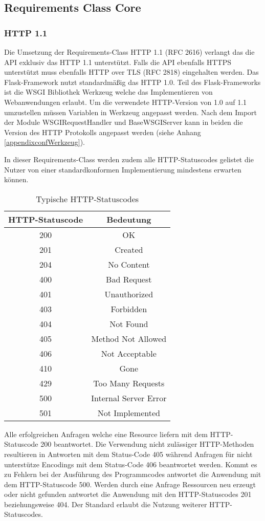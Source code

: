 \subsection{Requirements Class Core}
\subsubsection{HTTP 1.1}
Die Umsetzung der Requirements-Class HTTP 1.1 (RFC 2616) verlangt das die API exklusiv das HTTP 1.1 unterstützt. 
Falls die API ebenfalls HTTPS unterstützt muss ebenfalls HTTP over TLS (RFC 2818) eingehalten werden. 
Das Flask-Framework nutzt standardmäßig das HTTP 1.0. Teil des Flask-Frameworks ist die WSGI Bibliothek Werkzeug welche
das Implementieren von Webanwendungen erlaubt. Um die verwendete HTTP-Version von 1.0 auf 1.1 umzustellen müssen Variablen 
in Werkzeug angepasst werden. Nach dem Import der Module WSGIRequestHandler und BaseWSGIServer kann in beiden die 
Version des HTTP Protokolls angepasst werden (siehe Anhang \ref{appendixconfWerkzeug}). 

In dieser Requirements-Class werden zudem alle HTTP-Statuscodes gelistet die Nutzer von einer standardkonformen Implementierung mindestens erwarten können. 
\begin{table}[H]
    \caption{Typische HTTP-Statuscodes \cite{ogc_api_processes_core}}
    \centering
    \begin{tabular}{c c} 
        HTTP-Statuscode & Bedeutung\\ 
        \hline
        200 & OK\\
        201 & Created\\
        204 & No Content\\
        400 & Bad Request\\
        401 & Unauthorized\\
        403 & Forbidden\\
        404 & Not Found\\
        405 & Method Not Allowed\\
        406 & Not Acceptable\\
        410 & Gone\\
        429 & Too Many Requests\\
        500 & Internal Server Error\\
        501 & Not Implemented\\
    \end{tabular}\label{httpcodes}
\end{table}
Alle erfolgreichen Anfragen welche eine Resource liefern mit dem HTTP-Statuscode 200 beantwortet. Die Verwendung nicht zulässiger HTTP-Methoden resultieren 
in Antworten mit dem Status-Code 405 während Anfragen für nicht unterstütze Encodings mit dem Status-Code 406 beantwortet werden. Kommt es zu Fehlern bei der Ausführung 
des Programmcodes antwortet die Anwendung mit dem HTTP-Statuscode 500. Werden durch eine Anfrage Ressourcen neu erzeugt oder nicht gefunden antwortet die Anwendung mit 
den HTTP-Statuscodes 201 beziehungsweise 404. Der Standard erlaubt die Nutzung weiterer HTTP-Statuscodes.

